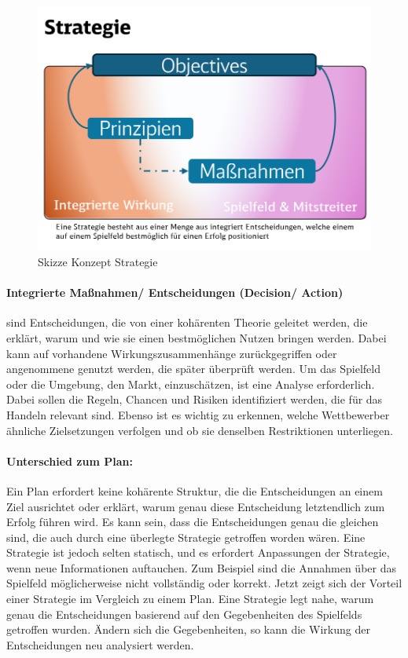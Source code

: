 \begin{figure}[H]
	\centering
	\includegraphics[scale = 0.3]{attachment/chapter_OWN/Scc006.png}
	\caption{Skizze Konzept Strategie}
\end{figure} 

\paragraph{Integrierte Maßnahmen/ Entscheidungen (Decision/ Action)} sind Entscheidungen, die von einer kohärenten Theorie geleitet werden, die erklärt, warum und wie sie einen bestmöglichen Nutzen bringen werden. Dabei kann auf vorhandene Wirkungszusammenhänge zurückgegriffen oder angenommene genutzt werden, die später überprüft werden. Um das Spielfeld oder die Umgebung, den Markt, einzuschätzen, ist eine Analyse erforderlich. Dabei sollen die Regeln, Chancen und Risiken identifiziert werden, die für das Handeln relevant sind. Ebenso ist es wichtig zu erkennen, welche Wettbewerber ähnliche Zielsetzungen verfolgen und ob sie denselben Restriktionen unterliegen.

\paragraph{Unterschied zum Plan:} Ein Plan erfordert keine kohärente Struktur, die die Entscheidungen an einem Ziel ausrichtet oder erklärt, warum genau diese Entscheidung letztendlich zum Erfolg führen wird. Es kann sein, dass die Entscheidungen genau die gleichen sind, die auch durch eine überlegte Strategie getroffen worden wären. Eine Strategie ist jedoch selten statisch, und es erfordert Anpassungen der Strategie, wenn neue Informationen auftauchen. Zum Beispiel sind die Annahmen über das Spielfeld möglicherweise nicht vollständig oder korrekt. Jetzt zeigt sich der Vorteil einer Strategie im Vergleich zu einem Plan. Eine Strategie legt nahe, warum genau die Entscheidungen basierend auf den Gegebenheiten des Spielfelds getroffen wurden. Ändern sich die Gegebenheiten, so kann die Wirkung der Entscheidungen neu analysiert werden.


